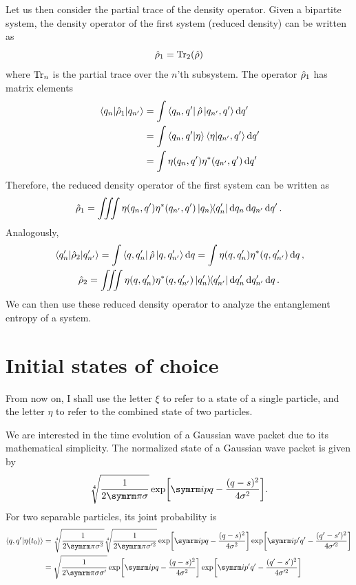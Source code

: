 Let us then consider the partial trace of the density operator. Given a bipartite system, the density operator of the first system (reduced density) can be written as
\begin{equation}
    \hat{\rho}_1 = \Tr_2(\hat{\rho})
\end{equation}
where $\Tr_n$ is the partial trace over the $n$'th subsystem. The operator $\hat{\rho}_1$ has matrix elements
\begin{align}
    \mel{q_n}{\hat{\rho}_1}{q_{n'}} &= \int\bra{q_n, q'}\hat{\rho}\ket{q_{n'}, q'}\dd{q'} \\
    &= \int\braket{q_n, q'}{\eta}\braket{\eta}{q_{n'}, q'}\dd{q'} \\
    &= \int\eta(q_n, q')\eta^{\ast}(q_{n'}, q')\dd{q'}
\end{align}
Therefore, the reduced density operator of the first system can be written as
\begin{equation}
    \hat{\rho}_1 = \iiint\eta(q_n, q')\eta^{\ast}(q_{n'}, q')\ketbra{q_n}{q_n'}\dd{q_n}\dd{q_{n'}}\dd{q'}.
\end{equation}
Analogously,
\begin{gather}
    \mel{q_n'}{\hat{\rho}_2}{q_{n'}'} = \int\bra{q, q_n'}\hat{\rho}\ket{q, q_{n'}'}\dd{q} = \int\eta(q, q_n')\eta^{\ast}(q, q_{n'}')\dd{q}, \\
    \hat{\rho}_2 = \iiint\eta(q, q_n')\eta^{\ast}(q, q_{n'}')\ketbra{q_n'}{q_{n'}'}\dd{q_n'}\dd{q_{n'}'}\dd{q}.
\end{gather}
We can then use these reduced density operator to analyze the entanglement entropy of a system.

\section{Initial states of choice}
\label{sec:initial_states_of_choice}

From now on, I shall use the letter $\xi$ to refer to a state of a single particle, and the letter $\eta$ to refer to the combined state of two particles.

We are interested in the time evolution of a Gaussian wave packet due to its mathematical simplicity. The normalized state of a Gaussian wave packet is given by
\begin{equation}
    \sqrt[4]{\frac{1}{2\cpi\sigma}}\exp[\im p q - \frac{(q - s)^2}{4\sigma^2}]. \label{eq:unentangled_state}
\end{equation}
For two separable particles, its joint probability is
\begin{align}
    \braket{q, q'}{\eta(t_0)} &= \sqrt[4]{\frac{1}{2\cpi\sigma^2}}\sqrt[4]{\frac{1}{2\cpi\sigma'^2}}\exp[\im pq - \frac{(q - s)^2}{4\sigma^2}]\exp[\im p'q' - \frac{(q' - s')^2}{4\sigma'^2}] \\
    &= \sqrt{\frac{1}{2\cpi\sigma\sigma'}}\exp[\im pq - \frac{(q - s)^2}{4\sigma^2}]\exp[\im p'q' - \frac{(q' - s')^2}{4\sigma'^2}]
\end{align}

